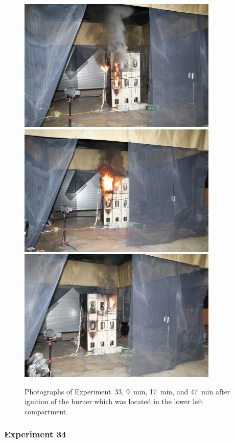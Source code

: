 \begin{figure}[p]
\centering
\includegraphics[height=2.50in]{../FIGURES/Test_33_9_min} \\
\includegraphics[height=2.50in]{../FIGURES/Test_33_17_min} \\
\includegraphics[height=2.50in]{../FIGURES/Test_33_47_min}
\caption[Photographs of Experiment~33]{Photographs of Experiment~33, 9~min, 17~min, and 47~min after ignition of the burner which was located in the lower left compartment.}
\label{fig:Test_33_photos}
\end{figure}



\clearpage

\subsubsection{Experiment 34}

